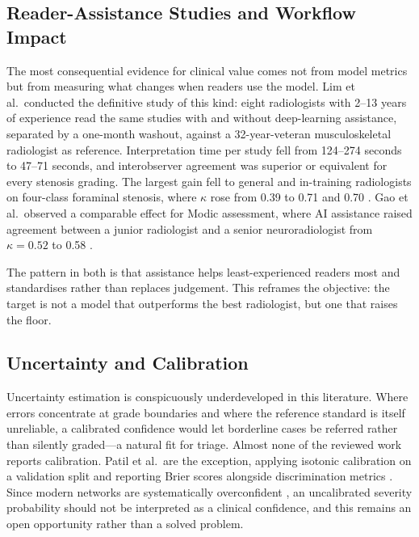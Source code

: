\subsection{Reader-Assistance Studies and Workflow Impact}
\label{sec:lr-reader-assistance}

The most consequential evidence for clinical value comes not from model metrics
but from measuring what changes when readers use the model. Lim et al.\ conducted
the definitive study of this kind: eight radiologists with 2--13 years of
experience read the same studies with and without deep-learning assistance,
separated by a one-month washout, against a 32-year-veteran musculoskeletal
radiologist as reference. Interpretation time per study fell from 124--274
seconds to 47--71 seconds, and interobserver agreement was superior or equivalent
for every stenosis grading. The largest gain fell to general and in-training
radiologists on four-class foraminal stenosis, where $\kappa$ rose from 0.39 to
0.71 and 0.70 \cite{lim2022improved}. Gao et al.\ observed a comparable effect
for Modic assessment, where AI assistance raised agreement between a junior
radiologist and a senior neuroradiologist from $\kappa = 0.52$ to 0.58
\cite{gao2022automatic}.

The pattern in both is that assistance helps least-experienced readers most and
standardises rather than replaces judgement. This reframes the objective: the
target is not a model that outperforms the best radiologist, but one that raises
the floor.

\subsection{Uncertainty and Calibration}
\label{sec:lr-uncertainty}

Uncertainty estimation is conspicuously underdeveloped in this literature. Where
errors concentrate at grade boundaries and where the reference standard is itself
unreliable, a calibrated confidence would let borderline cases be referred rather
than silently graded---a natural fit for triage. Almost none of the reviewed work
reports calibration. Patil et al.\ are the exception, applying isotonic
calibration on a validation split and reporting Brier scores alongside
discrimination metrics \cite{patil2026mribased}. Since modern networks are
systematically overconfident \cite{guo2017calibration}, an uncalibrated severity
probability should not be interpreted as a clinical confidence, and this remains
an open opportunity rather than a solved problem.

